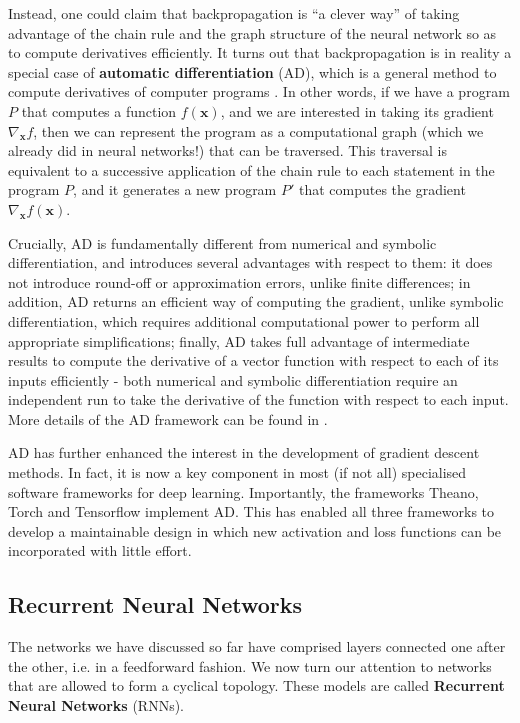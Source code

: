 \documentclass[pdftex,11pt,a4paper]{article}
\theoremstyle{definition}
\theoremstyle{remark}
\newcommand*{\V}[1]{\mathbf{#1}}%
\begin{document}
\par Instead, one could claim that backpropagation is ``a clever way'' of taking advantage of the chain rule and the graph structure of the neural network so as to compute derivatives efficiently. It turns out that backpropagation is in reality a special case of \textbf{automatic differentiation} (AD), which is a general method to compute derivatives of computer programs \cite{Kingma2014}. In other words, if we have a program $P$ that computes a function $f(\V{x})$, and we are interested in taking its gradient $\nabla_\V{x}f$, then we can represent the program as a computational graph (which we already did in neural networks!) that can be traversed. This traversal is equivalent to a successive application of the chain rule to each statement in the program $P$, and it generates a new program $P'$ that computes the gradient $\nabla_\V{x} f(\V{x})$.

\par Crucially, AD is fundamentally different from numerical and symbolic differentiation, and introduces several advantages with respect to them: it does not introduce round-off or approximation errors, unlike finite differences; in addition, AD returns an efficient way of computing the gradient, unlike symbolic differentiation, which requires additional computational power to perform all appropriate simplifications; finally, AD takes full advantage of intermediate results to compute the derivative of a vector function with respect to each of its inputs efficiently - both numerical and symbolic differentiation require an independent run to take the derivative of the function with respect to each input. More details of the AD framework can be found in \cite{Bucker2005ADA}.

\par AD has further enhanced the interest in the development of gradient descent methods. In fact, it is now a key component in most (if not all) specialised software frameworks for deep learning. Importantly, the frameworks Theano, Torch and Tensorflow implement AD. This has enabled all three frameworks to develop a maintainable design in which new activation and loss functions can be incorporated with little effort.

\subsection{Recurrent Neural Networks}
The networks we have discussed so far have comprised layers connected one after the other, i.e. in a feedforward fashion. We now turn our attention to networks that are allowed to form a cyclical topology. These models are called \textbf{Recurrent Neural Networks} (RNNs).
\end{document}
